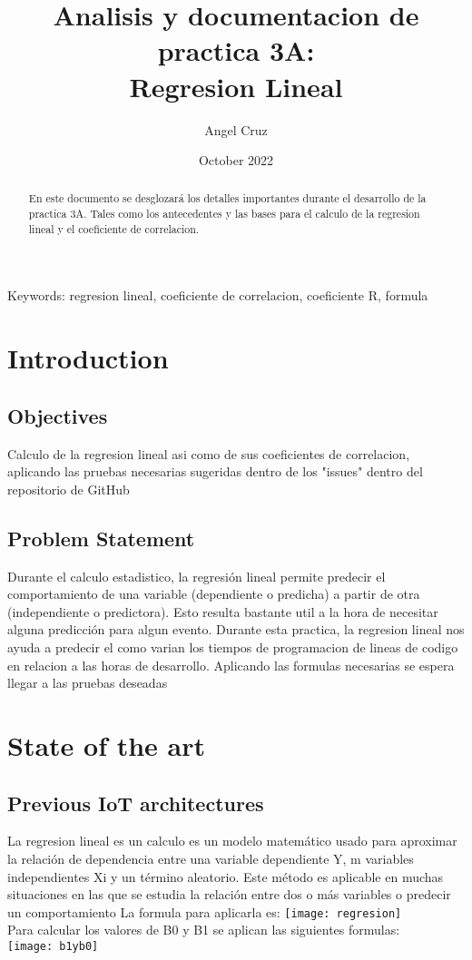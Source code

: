 \documentclass{article}
\title{Analisis y documentacion de practica 3A:\\
Regresion Lineal}
\author{Angel Cruz}
\date{October 2022}
\begin{document}
\maketitle

\begin{abstract}
{En este documento se desglozará los detalles importantes durante el desarrollo de la practica 3A. Tales como los antecedentes y las bases para el calculo de la regresion lineal y el coeficiente de correlacion. }

\end{abstract}

Keywords:
regresion lineal, coeficiente de correlacion, coeficiente R, formula

\section{Introduction}

\subsection{Objectives}
{Calculo de la regresion lineal asi como de sus coeficientes de correlacion, aplicando las pruebas necesarias sugeridas dentro de los "issues" dentro del repositorio de GitHub}
\subsection{Problem Statement}
{Durante el calculo estadistico, la regresión lineal permite predecir el comportamiento de una variable (dependiente o predicha) a partir de otra (independiente o predictora). Esto resulta bastante util a la hora de necesitar alguna predicción para algun evento.
Durante esta practica, la regresion lineal nos ayuda a predecir el como varian los tiempos de programacion de lineas de codigo en relacion a las horas de desarrollo.
Aplicando las formulas necesarias se espera llegar a las pruebas deseadas}
\section{State of the art}
\subsection{Previous IoT architectures}
{La regresion lineal es un calculo es un modelo matemático usado para aproximar la relación de dependencia entre una variable dependiente Y, m variables independientes Xi y un término aleatorio. Este método es aplicable en muchas situaciones en las que se estudia la relación entre dos o más variables o predecir un comportamiento}
{La formula para aplicarla es: }
\texttt{[image: regresion]}
{\\Para calcular los valores de B0 y B1 se aplican las siguientes formulas:\\}
\texttt{[image: b1yb0]}
\end{document}
